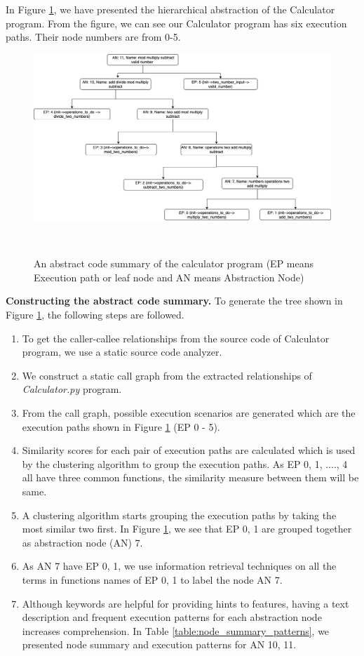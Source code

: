 In Figure \ref{fig:motivation}, we have presented the hierarchical abstraction of the Calculator program. From the figure, we can see our Calculator program has six execution paths. Their node numbers are from 0-5. 

\begin{figure}[h]
  \centering
  \includegraphics[width=\columnwidth]{figures/hla2/hla2_motivation.png}
  \caption{An abstract code summary of the calculator program (EP means Execution path or leaf node and AN means Abstraction Node)}~\label{fig:motivation}
\end{figure}

\textbf{Constructing the abstract code summary.} To generate the tree shown in Figure \ref{fig:motivation}, the following steps are followed.

\begin{enumerate}
    \item To get the caller-callee relationships from the source code of Calculator program, we use a static source code analyzer.
    \item We construct a static call graph from the extracted relationships of \emph{Calculator.py} program. 
    \item From the call graph, possible execution scenarios are generated  which are the execution paths shown in Figure \ref{fig:motivation} (EP 0 - 5).
    \item Similarity scores for each pair of execution paths are calculated which is used by the clustering algorithm to group the execution paths. As EP 0, 1, ...., 4 all have three common functions, the similarity measure between them  will be same.  
    \item A clustering algorithm starts grouping the execution paths by taking the most similar two first. In Figure \ref{fig:motivation}, we see that EP 0, 1 are grouped together as abstraction node (AN) 7.
    \item As AN 7 have EP 0, 1, we use information retrieval techniques on all the terms in functions names of EP 0, 1 to label the node AN 7. 
    \item Although keywords are helpful for providing hints to features, having a text description and frequent execution patterns for each abstraction node increases comprehension. In Table \ref{table:node_summary_patterns}, we presented node summary and execution patterns for AN 10, 11. 
    
\end{enumerate}



